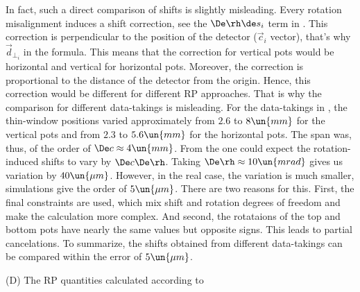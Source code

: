 In fact, such a direct comparison of shifts is slightly misleading. Every rotation misalignment induces a shift correction, see the $\De\rh \de s_i$ term in . This correction is perpendicular to the position of the detector ($\vec c_i$ vector), that's why $\vec d_{\perp_i}$ in the formula. This means that the correction for vertical pots would be horizontal and vertical for horizontal pots. Moreover, the correction is proportional to the distance of the detector from the origin. Hence, this correction would be different for different RP approaches. That is why the comparison for different data-takings is misleading. For the data-takings in , the thin-window positions varied approximately from $2.6$ to $8\un{mm}$ for the vertical pots and from $2.3$ to $5.6\un{mm}$ for the horizontal pots. The span was, thus, of the order of $\De c \approx 4\un{mm}$. From the  one could expect the rotation-induced shifts to vary by $\De c \De \rh$. Taking $\De\rh \approx 10 \un{mrad}$ gives us variation by $40\un{\mu m}$. However, in the real case, the variation is much smaller, simulations give the order of $5\un{\mu m}$. There are two reasons for this. First, the final constraints are used, which mix shift and rotation degrees of freedom and make the calculation more complex. And second, the rotataions of the top and bottom pots have nearly the same values but opposite signs. This leads to partial cancelations. To summarize, the shifts obtained from different data-takings can be compared within the error of $5\un{\mu m}$.


\> (D) The RP quantities calculated according to 



